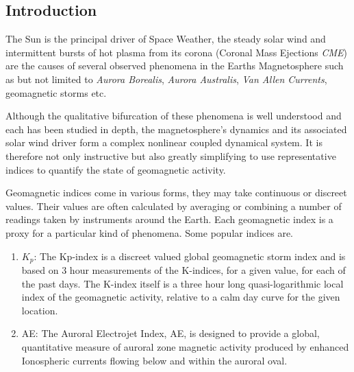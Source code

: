 \documentclass[referee,a4paper,12pt,traditabstract]{swsc}
\begin{document}
\begin{linenumbers}

   \maketitle

\section{Introduction}

The Sun is the principal driver of Space Weather, the steady solar wind and intermittent bursts of hot plasma from its corona (Coronal Mass Ejections \emph{CME}) are the causes of several observed phenomena in the Earths Magnetosphere such as but not limited to \emph{Aurora Borealis}, \emph{Aurora Australis}, \emph{Van Allen Currents}, geomagnetic storms etc.

Although the qualitative bifurcation of these phenomena is well understood and each has been studied in depth, the magnetosphere's dynamics and its associated solar wind driver form a complex nonlinear coupled dynamical system. It is therefore not only instructive but also greatly simplifying to use representative indices to quantify the state of geomagnetic activity.

Geomagnetic indices come in various forms, they may take continuous or discreet values. Their values are often calculated by averaging or combining a number of readings taken by instruments around the Earth. Each geomagnetic index is a proxy for a particular kind of phenomena. Some popular indices are.

\begin{enumerate}
    \item $K_p$: The Kp-index is a discreet valued global geomagnetic storm index and is based on 3 hour measurements of the K-indices, for a given value, for each of the past days. The K-index itself is a three hour long quasi-logarithmic local index of the geomagnetic activity, relative to a calm day curve for the given location.
    
    \item AE: The Auroral Electrojet Index, AE, is designed to provide a global, quantitative measure of auroral zone magnetic activity produced by enhanced Ionospheric currents flowing below and within the auroral oval.
    

\end{enumerate}
\end{linenumbers}
\end{document}

